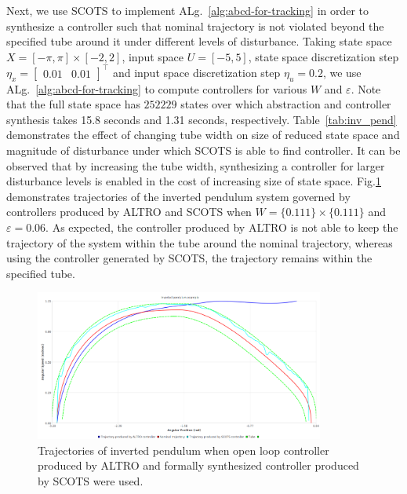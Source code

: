 Next, we use SCOTS to implement ALg.~\ref{alg:abcd-for-tracking} in order to synthesize a controller such that nominal trajectory is not violated beyond the specified tube around it under different levels of disturbance. Taking state space $X=[-\pi,\pi]\times[-2,2]$, input space $U=[-5,5]$, state space discretization step $\eta_x=\begin{bmatrix}0.01&0.01\end{bmatrix}^\top$ and input space discretization step $\eta_u=0.2$, we use ALg.~\ref{alg:abcd-for-tracking} to compute controllers for various $W$ and $\varepsilon$. Note that the full state space has $252229$ states over which abstraction and controller synthesis takes 15.8 seconds and 1.31 seconds, respectively. Table~\ref{tab:inv_pend} demonstrates the effect of changing tube width on size of reduced state space and magnitude of disturbance under which SCOTS is able to find controller. It can be observed that by increasing the tube width, synthesizing a controller for larger disturbance levels is enabled in the cost of increasing size of state space. Fig.\ref{fig:invpend_traj} demonstrates trajectories of the inverted pendulum system governed by controllers produced by ALTRO and SCOTS when $W=\{0.111\}\times \{0.111\}$ and $\varepsilon=0.06$. As expected, the controller produced by ALTRO is not able to keep the trajectory of the system within the tube around the nominal trajectory, whereas using the controller generated by SCOTS, the trajectory remains within the specified tube.
\begin{figure}[t]\label{fig:invpend_traj}
	\centering
	\includegraphics[width=0.85\textwidth]{traj_inv_pend.png}
	\caption{Trajectories of inverted pendulum when open loop controller produced by ALTRO and formally synthesized controller produced by SCOTS were used.}
\end{figure}
